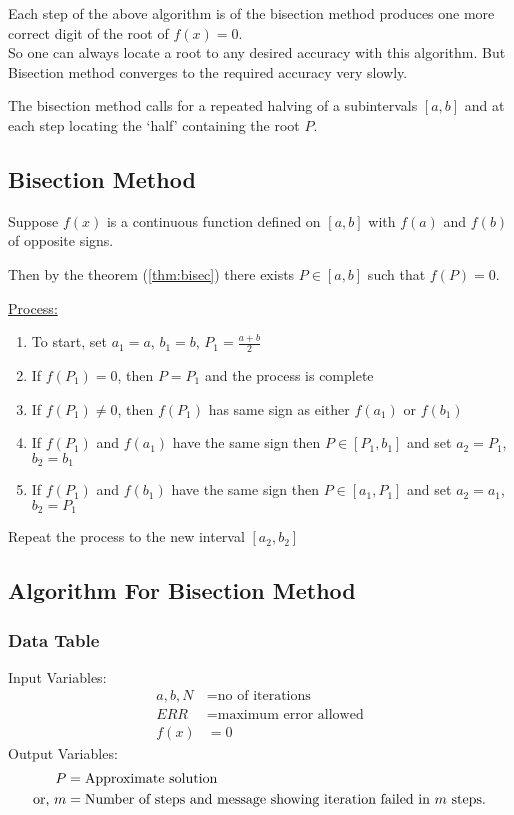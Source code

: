 \documentclass[12pt,class=book,crop=false]{standalone}
\begin{document}
Each step of the above algorithm is of the bisection method produces one more correct digit of the root of \( f(x)=0 \).\\

So one can always locate a root to any desired accuracy with this algorithm. But Bisection method converges to the required accuracy very slowly.

The bisection method calls for a repeated halving of a subintervals \( [a,b] \) and at each step locating the `half' containing the root \( P \).
\subsection{Bisection Method}

Suppose \( f(x) \) is a continuous function defined on \( [a,b] \) with \( f(a) \) and \( f(b) \) of opposite signs.

Then by the theorem (\ref{thm:bisec}) there exists \( P\in[a,b] \) such that \( f(P)=0 \).

\underline{Process:}
\begin{enumerate}
    \item To start, set \( a_1=a \), \( b_1=b \), \( P_1=\frac{a+b}{2} \)
    \item If \( f(P_1)=0 \), then \( P=P_1 \) and the process is complete
    \item If \( f(P_1)\neq 0 \), then \( f(P_1) \) has same sign as either \( f(a_1) \) or \( f(b_1) \)
    \item If \( f(P_1) \) and \( f(a_1) \) have the same sign then \( P\in [P_1,b_1 ] \) and set \( a_2=P_1 \), \( b_2=b_1 \)
    \item If \( f(P_1) \) and \( f(b_1) \) have the same sign then \( P\in [a_1,P_1 ] \) and set \( a_2=a_1 \), \( b_2=P_1 \)
\end{enumerate}
Repeat the process to the new interval \( [a_2,b_2] \)
\subsection{Algorithm For Bisection Method}
\subsubsection{Data Table}
Input Variables:
\begin{align*}
    a,b,N & =\text{no of iterations}      \\
    ERR   & =\text{maximum error allowed} \\
    f(x)  & =0
\end{align*}
Output Variables:
\begin{align*}
    P            & =\text{Approximate solution}                                                   \\
    \text{or, }m & =\text{Number of steps and message showing iteration failed in \( m \) steps.}
\end{align*}
\end{document}
